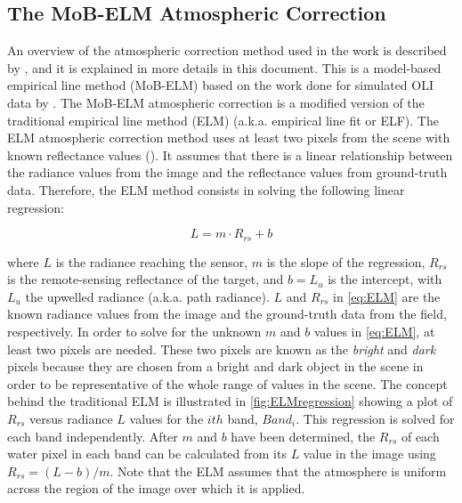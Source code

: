 \documentclass[onecolumn,3p,letterpaper]{elsarticle}
\begin{document}
\subsection{The MoB-ELM Atmospheric Correction}
An overview of the atmospheric correction method used in the work is described by \cite{Concha2014SPIE}, and it is explained in more details in this document. This is a model-based empirical line method (MoB-ELM) based on the work done for simulated OLI data by \cite{Gerace:2012}. The MoB-ELM atmospheric correction is a modified version of the traditional empirical line method (ELM) (a.k.a. empirical line fit or ELF). The ELM atmospheric correction method uses at least two pixels from the scene with known reflectance values (\cite{Schott}). It assumes that there is a linear relationship between the radiance values from the image and the reflectance values from ground-truth data. Therefore, the ELM method consists in solving the following linear regression:

\begin{equation}\label{eq:ELM} 
	L = m\cdot R_{rs} + b
\end{equation}

\noindent where $L$ is the radiance reaching the sensor, $m$ is the slope of the regression, $R_{rs}$ is the remote-sensing reflectance of the target, and $b=L_u$ is the intercept, with $L_u$ the upwelled radiance (a.k.a. path radiance). $L$ and $R_{rs}$ in \autoref{eq:ELM} are the known radiance values from the image and the ground-truth data from the field, respectively. In order to solve for the unknown $m$ and $b$ values in \autoref{eq:ELM}, at least two pixels are needed. These two pixels are known as the {\it bright} and {\it dark} pixels because they are chosen from a bright and dark object in the scene in order to be representative of the whole range of values in the scene. The concept behind the traditional ELM is illustrated in \autoref{fig:ELMregression} showing a plot of $R_{rs}$ versus radiance $L$ values for the $ith$ band, $Band_{i}$. This regression is solved for each band independently. After $m$ and $b$ have been determined, the $R_{rs}$ of each water pixel in each band can be calculated from its $L$ value in the image using $R_{rs}=(L-b)/m$. Note that the ELM assumes that the atmosphere is uniform across the region of the image over which it is applied.
\end{document}
